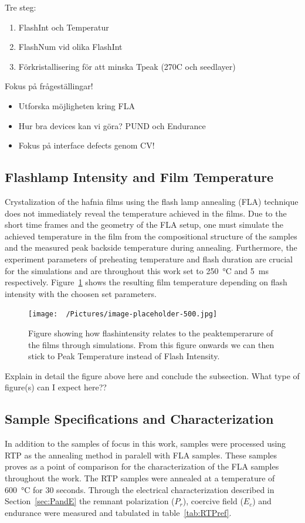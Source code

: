 \documentclass[11pt]{article}
\begin{document}
    Tre steg:
    \begin{enumerate}
        \item FlashInt och Temperatur
        \item FlashNum vid olika FlashInt
        \item Förkristallisering för att minska Tpeak (270C och seedlayer)
    \end{enumerate}

    Fokus på frågeställingar!
    \begin{itemize}
        \item Utforska möjligheten kring FLA
        \item Hur bra devices kan vi göra? PUND och Endurance
        \item Fokus på interface defects genom CV!\  
    \end{itemize}
    \fi

    \subsection{Flashlamp Intensity and Film Temperature}
    Crystalization of the hafnia films using the flash lamp annealing (FLA) technique does not immediately reveal the temperature achieved in the films. Due to the short time frames and the geometry of the FLA setup, one must simulate the achieved temperature in the film from the compositional structure of the samples and the measured peak backside temperature during annealing. Furthermore, the experiment parameters of preheating temperature and flash duration are crucial for the simulations and are throughout this work set to \SI{250}{\celsius} and \SI{5}{\milli\second} respectively. Figure~\ref{fig:res_ComsolSim} shows the resulting film temperature depending on flash intensity with the choosen set parameters.
    
    \begin{figure}[ht!]
        \centering
        \texttt{[image: ~/Pictures/image-placeholder-500.jpg]}
        \caption{Figure showing how flashintensity relates to the peaktemperarure of the films through simulations. From this figure onwards we can then stick to Peak Temperature instead of Flash Intensity.}\label{fig:res_ComsolSim}
    \end{figure}

    Explain in detail the figure above here and conclude the subsection. What type of figure(s) can I expect here??

    \subsection{Sample Specifications and Characterization}
    In addition to the samples of focus in this work, samples were processed using RTP as the annealing method in paralell with FLA samples. These samples proves as a point of comparison for the characterization of the FLA samples throughout the work. The RTP samples were annealed at a temperature of \SI{600}{\celsius} for 30 seconds. Through the electrical characterization described in Section~\ref{sec:PandE} the remnant polarization ($P_r$), coercive field ($E_c$) and endurance were measured and tabulated in table~\ref{tab:RTPref}.
\end{document}
